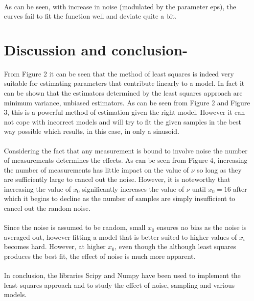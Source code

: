 \documentclass[a4paper, 11pt, margin= 1.25cm ]{article}
\begin{document}
    \begin{center}
    \end{center}
    { \hspace*{\fill} \\}

    \begin{multicols}{2}
    As can be seen, with increase in noise (modulated by the parameter eps),
the curves fail to fit the function well and deviate quite a bit.


\section{Discussion and conclusion-}\label{discussion-and-conclusion-}
\paragraph{} From Figure 2 it can be seen that the method of least squares is indeed
very suitable for estimating parameters that contribute linearly to a
model. In fact it can be shown that the estimators determined by the
least squares approach are minimum variance, unbiased estimators. As can
be seen from Figure 2 and Figure 3, this is a powerful method of
estimation given the right model. However it can not cope with incorrect
models and will try to fit the given samples in the best way possible
which results, in this case, in only a sinusoid.

\paragraph{} Considering the fact that any measurement is bound to involve noise the
number of measurements determines the effects. As can be seen from
Figure 4, increasing the number of measurements has little impact on the
value of $\nu$ so long as they are sufficiently large to cancel out the
noise. However, it is noteworthy that increasing the value of $x_0$
significantly increases the value of $\nu$ until $x_0 = 16$ after which
it begins to decline as the number of samples are simply insufficient to
cancel out the random noise.

\paragraph{} Since the noise is assumed to be random, small $x_0$ ensures no bias as
the noise is averaged out, however fitting a model that is better suited
to higher values of $x_i$ becomes hard. However, at higher $x_0$, even
though the although least squares produces the best fit, the effect of
noise is much more apparent.

\paragraph{} In conclusion, the libraries Scipy and Numpy have been used to implement
the least squares approach and to study the effect of noise, sampling
and various models.
    \end{multicols}

    
    
    
    
\end{document}
